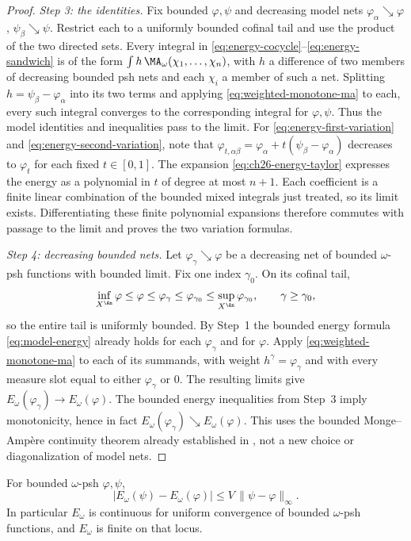 \begin{proof}
\emph{Step 3: the identities.}  Fix bounded \(\varphi,\psi\) and decreasing
model nets \(\varphi_\alpha\searrow\varphi\),
\(\psi_\beta\searrow\psi\).  Restrict each to a uniformly bounded cofinal
tail and use the product of the two directed sets.  Every integral in
\eqref{eq:energy-cocycle}--\eqref{eq:energy-sandwich} is of the form
\(\int h\,\MA_\omega(\chi_1,\ldots,\chi_n)\), with \(h\) a difference of
two members of decreasing bounded psh nets and each \(\chi_i\) a member
of such a net.  Splitting \(h=\psi_\beta-\varphi_\alpha\) into its two
terms and applying \eqref{eq:weighted-monotone-ma} to each, every such
integral converges to the corresponding integral for \(\varphi,\psi\).
Thus the model identities and inequalities pass to the limit.  For
\eqref{eq:energy-first-variation} and
\eqref{eq:energy-second-variation}, note that
\(\varphi_{t,\alpha\beta}=\varphi_\alpha+t(\psi_\beta-\varphi_\alpha)\)
decreases to \(\varphi_t\) for each fixed \(t\in[0,1]\).  The expansion
\eqref{eq:ch26-energy-taylor} expresses the energy as a polynomial in
\(t\) of degree at most \(n+1\).  Each coefficient is a finite linear
combination of the bounded mixed integrals just treated, so its limit
exists.  Differentiating these finite polynomial expansions therefore
commutes with passage to the limit and proves the two variation formulas.

\emph{Step 4: decreasing bounded nets.}  Let
\(\varphi_\gamma\searrow\varphi\) be a decreasing net of bounded
\(\omega\)-psh functions with bounded limit.  Fix one index \(\gamma_0\).
On its cofinal tail,
\[
 \inf_{X^{\An}}\varphi\leq\varphi\leq\varphi_\gamma
 \leq\varphi_{\gamma_0}\leq\sup_{X^{\An}}\varphi_{\gamma_0},
 \qquad \gamma\geq\gamma_0,
\]
so the entire tail is uniformly bounded.  By Step~1 the bounded energy
formula \eqref{eq:model-energy} already holds for each
\(\varphi_\gamma\) and for \(\varphi\).  Apply
\eqref{eq:weighted-monotone-ma} to each of its summands, with weight
\(h^\gamma=\varphi_\gamma\) and with every measure slot equal to either
\(\varphi_\gamma\) or \(0\).  The resulting limits give
\(E_\omega(\varphi_\gamma)\to E_\omega(\varphi)\).
The bounded energy inequalities from Step~3 imply monotonicity, hence in
fact \(E_\omega(\varphi_\gamma)\searrow E_\omega(\varphi)\).
This uses the bounded Monge--Amp\`ere continuity theorem already established
in , not a new choice or diagonalization of model nets.
\end{proof}

\begin{proposition}
\label{prop:ch26-energy-lipschitz}
For bounded \(\omega\)-psh \(\varphi,\psi\),
\begin{equation}
\label{eq:ch26-energy-lipschitz}
 \bigl|E_\omega(\psi)-E_\omega(\varphi)\bigr|
 \leq V\,\lVert\psi-\varphi\rVert_\infty .
\end{equation}
In particular \(E_\omega\) is continuous for uniform convergence of bounded
\(\omega\)-psh functions, and \(E_\omega\) is finite on that locus.
\end{proposition}

